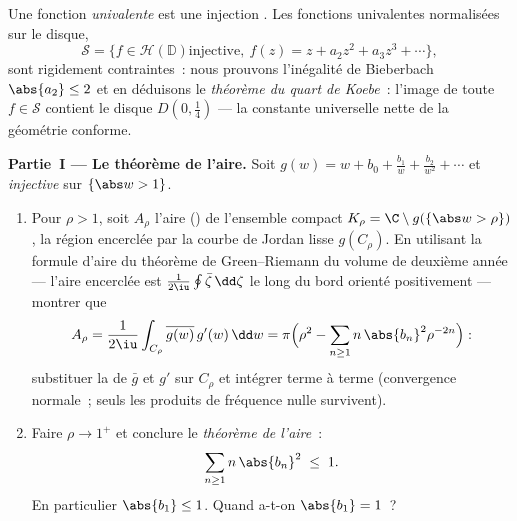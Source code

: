 \begin{problem}\label{pb:b3:conformal:1}
Une fonction \emph{univalente} est une injection .
Les fonctions univalentes normalisées sur le disque,
\[
\mathcal S = \bigl\{f \in \mathcal H(\mathbb D) \text{
injective},\ f(z) = z + a_2z^2 + a_3z^3 + \cdots\bigr\},
\]
sont rigidement contraintes~: nous prouvons l'inégalité de
Bieberbach $\abs{a_2} \leq 2$ et en déduisons le
\emph{théorème du quart de Koebe}~: l'image de toute $f \in
\mathcal S$ contient le disque $D(0, \frac14)$ --- la
constante universelle nette de la géométrie
conforme.

\medskip
\noindent\textbf{Partie~I --- Le théorème de l'aire.} Soit
$g(w) = w + b_0 + \frac{b_1}w + \frac{b_2}{w^2} + \cdots$
 et \emph{injective} sur $\{\abs w > 1\}$.
\begin{enumerate}
  \item Pour $\rho > 1$, soit $A_\rho$ l'aire () de l'ensemble compact $K_\rho =
        \C\setminus g(\{\abs w > \rho\})$, la région
        encerclée par la courbe de Jordan lisse $g(C_\rho)$.
        En utilisant la formule d'aire du théorème de
        Green--Riemann du volume de deuxième année ---
        l'aire encerclée est $\frac1{2\iu}
        \oint\bar\zeta\,\dd\zeta$ le long du bord orienté
        positivement --- montrer que
        \[
        A_\rho = \frac{1}{2\iu}\int_{C_\rho}
        \overline{g(w)}\,g'(w)\,\dd w
        = \pi\Bigl(\rho^2 -
        \sum_{n\geq1}n\,\abs{b_n}^2\rho^{-2n}\Bigr) :
        \]
        substituer la  de $\bar g$ et $g'$
        sur $C_\rho$ et intégrer terme à terme (convergence
        normale~; seuls les produits de fréquence nulle
        survivent).
  \item Faire $\rho \to 1^+$ et conclure le \emph{théorème de
        l'aire}~:
        \[
        \sum_{n\geq1}n\,\abs{b_n}^2 \;\leq\; 1 .
        \]
        En particulier $\abs{b_1} \leq 1$. Quand a-t-on
        $\abs{b_1} = 1$~?
\end{enumerate}


\end{problem}
